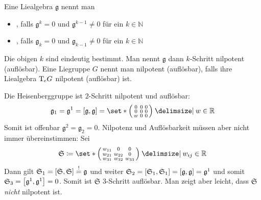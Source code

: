 \begin{definition}[{name=[nilpotent und auflösbar]}]
	Eine Liealgebra $\mathfrak{g}$ nennt man
	\begin{itemize}
		\item {}, falls $\mathfrak{g}^k=0$ und $\mathfrak{g}^{k-1}\neq 0$ für ein $k \in \mathbb{N}$
		\item {}, falls $\mathfrak{g}_k=0$ und $\mathfrak{g}_{k-1} \neq 0$ für ein $k \in \mathbb{N}$  
	\end{itemize}
	Die obigen $k$ sind eindeutig bestimmt. 
	Man nennt $\mathfrak{g}$ dann $k$-Schritt nilpotent (auflösbar).
	Eine Liegruppe $G$ nennt man nilpotent (auflösbar), falls ihre Liealgebra $\Tmap_e G$ nilpotent (auflösbar) ist.
\end{definition}

\begin{beispiel*}[{name=[Heisenberggruppe ist nilpotent und auflösbar]}]
	Die Heisenberggruppe ist $2$-Schritt nilpotent und auflösbar:
	\[
		\mathfrak{g}_1 = \mathfrak{g}^1 = \benbrace*{\mathfrak{g},\mathfrak{g}} = \set*{\begin{psmallmatrix}
			0 & 0 & 0 \\
			0 & 0 & 0 \\
			w & 0 & 0
		\end{psmallmatrix} \given w \in \mathbb{R}}
	\]
	Somit ist offenbar $\mathfrak{g}^2 =\mathfrak{g}_2=0$.
	Nilpotenz und Auflösbarkeit müssen aber nicht immer übereinstimmen:
	Sei 
	\[
		\mathfrak{S} \coloneqq \set*{\begin{psmallmatrix}
			w_{11} & 0 & 0 \\
			w_{21} & w_{22} & 0 \\
			w_{31} & w_{32} & w_{33}
		\end{psmallmatrix} \given w_{ij} \in \mathbb{R}}
	\]
	Dann gilt $\mathfrak{S}_1= \benbrace*{\mathfrak{S},\mathfrak{S}}\stackrel{!}{=} \mathfrak{g}$ und weiter
	$\mathfrak{S}_2 = \benbrace*{\mathfrak{S}_1,\mathfrak{S}_1} = \benbrace*{\mathfrak{g},\mathfrak{g}} = \mathfrak{g}^1$ und somit $\mathfrak{S}_3 = \benbrace*{\mathfrak{g}^1,\mathfrak{g}^1} =0$.
	Somit ist $\mathfrak{S}$ $3$-Schritt auflösbar.
	Man zeigt aber leicht, dass $\mathfrak{S}$ \emph{nicht} nilpotent ist.
\end{beispiel*}

